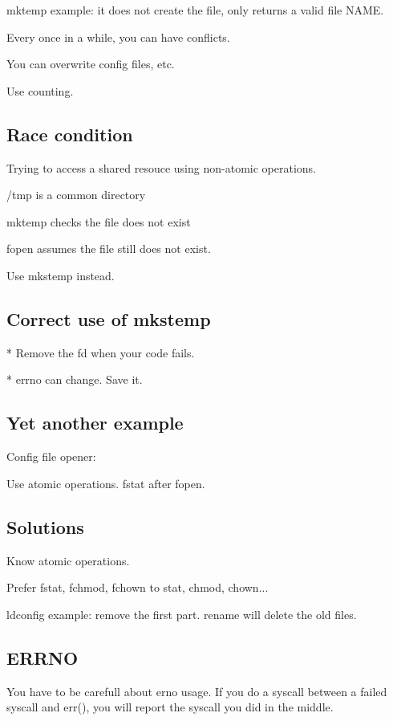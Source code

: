 \documentclass[a4paper,11pt]{article}
\begin{document}
mktemp example: it does not create the file, only returns a valid file NAME.

Every once in a while, you can have conflicts.

You can overwrite config files, etc.

Use counting.

\subsection{Race condition}

Trying to access a shared resouce using non-atomic operations.

/tmp is a common directory

mktemp checks the file does not exist

fopen assumes the file still does not exist.

Use mkstemp instead.

\subsection{Correct use of mkstemp}

* Remove the fd when your code fails.

* errno can change. Save it.

\subsection{Yet another example}

Config file opener:

Use atomic operations. fstat after fopen.

\subsection{Solutions}

Know atomic operations.

Prefer fstat, fchmod, fchown to stat, chmod, chown...

ldconfig example: remove the first part. rename will delete the old files.

\subsection{ERRNO}

You have to be carefull about erno usage. If you do a syscall between a failed
syscall and err(), you will report the syscall you did in the middle.
\end{document}
